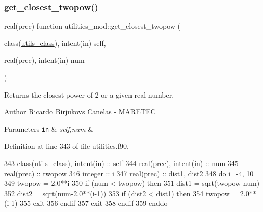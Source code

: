 \subsubsection{\texorpdfstring{get\+\_\+closest\+\_\+twopow()}{get\_closest\_twopow()}}
{\footnotesize\ttfamily real(prec) function utilities\+\_\+mod\+::get\+\_\+closest\+\_\+twopow (\begin{DoxyParamCaption}\item[{class(\mbox{\hyperlink{structutilities__mod_1_1utils__class}{utils\+\_\+class}}), intent(in)}]{self,  }\item[{real(prec), intent(in)}]{num }\end{DoxyParamCaption})\hspace{0.3cm}{\ttfamily [private]}}



Returns the closest power of 2 or a given real number. 

\begin{DoxyAuthor}{Author}
Ricardo Birjukovs Canelas -\/ M\+A\+R\+E\+T\+EC 
\end{DoxyAuthor}

\begin{DoxyParams}[1]{Parameters}
\mbox{\tt in}  & {\em self,num} & \\
\hline
\end{DoxyParams}


Definition at line 343 of file utilities.\+f90.


\begin{DoxyCode}
343     \textcolor{keywordtype}{class}(utils\_class), \textcolor{keywordtype}{intent(in)} :: self
344     \textcolor{keywordtype}{real(prec)}, \textcolor{keywordtype}{intent(in)} :: num
345     \textcolor{keywordtype}{real(prec)} :: twopow
346     \textcolor{keywordtype}{integer} :: i
347     \textcolor{keywordtype}{real(prec)} :: dist1, dist2
348     \textcolor{keywordflow}{do} i=-4, 10
349         twopow = 2.0**i
350         \textcolor{keywordflow}{if} (num < twopow) \textcolor{keywordflow}{then}
351             dist1 = sqrt(twopow-num)
352             dist2 = sqrt(num-2.0**(i-1))
353             \textcolor{keywordflow}{if} (dist2 < dist1) \textcolor{keywordflow}{then}
354                 twopow = 2.0**(i-1)
355                 \textcolor{keywordflow}{exit}
356 \textcolor{keywordflow}{            endif}
357             \textcolor{keywordflow}{exit}
358 \textcolor{keywordflow}{        endif}
359 \textcolor{keywordflow}{    enddo}
\end{DoxyCode}
\mbox{\label{namespaceutilities__mod_ab5b97f243f9347a40db76d55509d37ca}} 
